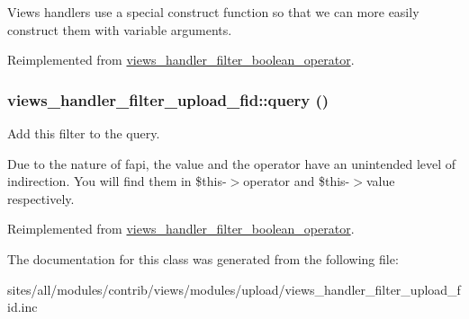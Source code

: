 Views handlers use a special construct function so that we can more easily construct them with variable arguments. 

Reimplemented from \hyperlink{classviews__handler__filter__boolean__operator_659352df10ef3144359e90247f450ef2}{views\_\-handler\_\-filter\_\-boolean\_\-operator}.\hypertarget{classviews__handler__filter__upload__fid_84a251fda29d367d7c915b736fe43b46}{
\subsubsection[{query}]{\setlength{\rightskip}{0pt plus 5cm}views\_\-handler\_\-filter\_\-upload\_\-fid::query ()}}
\label{classviews__handler__filter__upload__fid_84a251fda29d367d7c915b736fe43b46}


Add this filter to the query.

Due to the nature of fapi, the value and the operator have an unintended level of indirection. You will find them in \$this-$>$operator and \$this-$>$value respectively. 

Reimplemented from \hyperlink{classviews__handler__filter__boolean__operator_b3afc650701939c060e684d75fa2b21b}{views\_\-handler\_\-filter\_\-boolean\_\-operator}.

The documentation for this class was generated from the following file:\begin{CompactItemize}
\item 
sites/all/modules/contrib/views/modules/upload/views\_\-handler\_\-filter\_\-upload\_\-fid.inc\end{CompactItemize}
